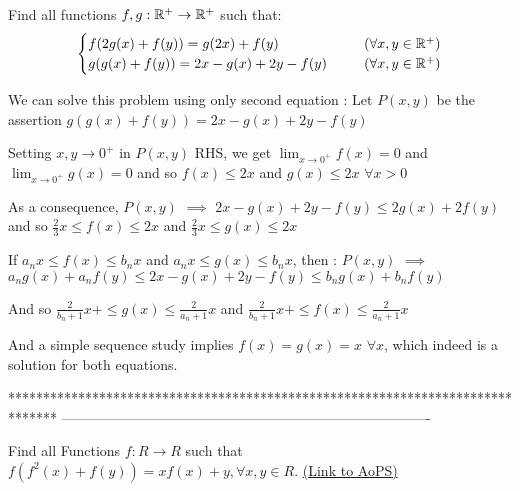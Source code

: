 \begin{solution}
	\begin{tcolorbox}Find all functions $f,g:\Bbb{R}^+ \to \Bbb{R}^+$ such that: 
\[ \begin{cases} 
f(2g(x)+f(y))=g(2x)+f(y) & (\forall x,y\in \Bbb{R}^+) \\ 
g(g(x)+f(y))=2x-g(x)+2y-f(y) \ \ \ \ \   & (\forall x,y\in \Bbb{R}^+)
 \end{cases} \]\end{tcolorbox}
We can solve this problem using only second equation :
Let $P(x,y)$ be the assertion $g(g(x)+f(y))=2x-g(x)+2y-f(y)$

Setting $x,y\to 0^+$ in $P(x,y)$ RHS, we get $\lim_{x\to 0^+}f(x)=0$ and $\lim_{x\to 0^+}g(x)=0$ and so $f(x)\le 2x$ and $g(x)\le 2x$ $\forall x>0$

As a consequence, $P(x,y)$ $\implies$ $2x-g(x)+2y-f(y)\le 2g(x)+2f(y)$ and so $\frac 23x\le f(x)\le 2x$ and $\frac 23x\le g(x)\le 2x$

If $a_nx\le f(x)\le b_nx$ and $a_nx\le g(x)\le b_nx$, then :
$P(x,y)$ $\implies$ $a_ng(x)+a_nf(y)\le 2x-g(x)+2y-f(y)\le b_ng(x)+b_nf(y)$

And so $\frac 2{b_n+1}x+\le g(x)\le \frac 2{a_n+1}x$ and $\frac 2{b_n+1}x+\le f(x)\le \frac 2{a_n+1}x$

And a simple sequence study implies $\boxed{f(x)=g(x)=x}$ $\forall x$, which indeed is a solution for both equations.
\end{solution}
*******************************************************************************
-------------------------------------------------------------------------------

\begin{problem}
	Find all Functions $f:R \to R$ such that $f\left( {{f^2}\left( x \right) + f\left( y \right)} \right) = xf\left( x \right) + y,\forall x,y \in R.$
	\flushright \href{https://artofproblemsolving.com/community/c6h565030}{(Link to AoPS)}
\end{problem}



